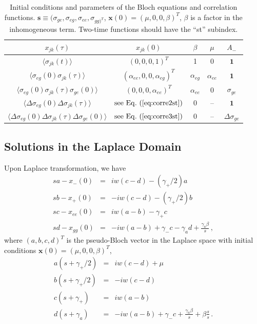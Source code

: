 \documentclass[twocolumn,aps,eqsecnum,showkeys,amsmath]{revtex4-2}
\begin{document}
% 
\begin{table}[b]
\caption{Initial conditions and parameters of the Bloch equations and 
correlation functions. 
$\mathbf{s} \equiv (\sigma_{ge}, \sigma_{eg}, \sigma_{ee}, \sigma_{gg)^T}$, 
$\mathbf{x}(0) = ( \mu,0,0,\beta)^T$, $\beta$ is a factor in the 
inhomogeneous term. Two-time functions should have the ``st'' subindex.} 
\begin{ruledtabular}
\begin{tabular}{ccccc} 		%
$x_{jk} (\tau)$ & $x_{jk}(0)$ & $\beta$ & $\mu$ & $A_-$ \\ \hline
%
$\langle \sigma_{jk} (t) \rangle$  & $(0,0,0,1)^T$ & 1 & 0 & $\mathbf{1}$	\\ 
%
$\langle \sigma_{eg}(0) \sigma_{jk}(\tau) \rangle$ & 
	$(\alpha_{ee},0,0,\alpha_{eg})^T$  & $\alpha_{eg}$ & $\alpha_{ee}$ & 
	$\mathbf{1}$ 	\\ 
%
$\langle \sigma_{eg}(0) \sigma_{jk}(\tau) \sigma_{ge}(0) \rangle$ 
	 & $(0,0,0,\alpha_{ee})^T$ & $\alpha_{ee}$ & 0  & $\sigma_{ge}$    \\  
%
$\langle \Delta \sigma_{eg}(0) \Delta \sigma_{jk}(\tau) \rangle$ 
	&  $\mathrm{see \,\,Eq.}~(\ref{eq:corre2st})$ & 0 & -- & $\mathbf{1}$  \\ 
%
$\langle \Delta \sigma_{eg}(0) \Delta \sigma_{jk}(\tau) \Delta \sigma_{ge} (0) \rangle$  
	&  $\mathrm{see \,\,Eq.}~(\ref{eq:corre3st})$ & 0 & -- & 
	$\Delta \sigma_{ge}$ 		
\label{default}
\end{tabular}	
\end{ruledtabular}
\end{table}

\subsection{Solutions in the Laplace Domain} %
Upon Laplace transformation, we have 
%
\begin{eqnarray*} 	
s a - x_-(0) &=& i w (c -d) -(\gamma_+/2) a 	\\ 
s b - x_+(0) &=& -i w (c -d) -(\gamma_+/2) b 	\\ 
s c - x_{ee}(0) &=& i w (a-b) -\gamma_+ c 		\\ 
s d - x_{gg}(0) &=& -i w (a-b) +\gamma_- c -\gamma_a d 
	+\frac{\gamma_a \beta}{s} \,,
\end{eqnarray*} 
where $(a,b,c,d)^T$ is the pseudo-Bloch vector in the Laplace space 
with initial conditions $\mathbf{x}(0) = ( \mu,0,0,\beta)^T$,  
%
\begin{eqnarray*} 	
a (s +\gamma_+/2) &=& i w (c -d)  +\mu 	\\ 
b (s +\gamma_+/2) &=& -i w (c -d)  	\\ 
c (s +\gamma_+) &=& i w (a-b)  		\\ 
d (s +\gamma_a)  &=& -i w (a-b) +\gamma_- c  
	+\frac{\gamma_a \beta}{s} + \beta \frac{s}{s} \,.
\end{eqnarray*} 
\end{document}
